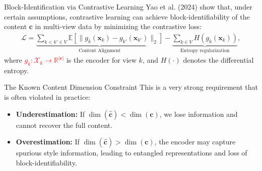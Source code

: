 \documentclass[a4paper,10pt]{beamer}
\begin{document}
\begin{frame}{Block-Identification via Contrastive Learning}
  Yao et al. (2024) \cite{yao2024multiviewcausalrepresentationlearning} show that, under certain assumptions, contrastive learning can achieve block-identifiability of the content $\mathbf{c}$ in multi-view data by minimizing the contrastive loss:
  \begin{align*}
    \mathcal{L} = \underbrace{\sum_{k < k' \in V} \mathbb{E} \left[ \|g_k(\mathbf{x}_k) - g_{k'}(\mathbf{x}_{k'})\|_2 \right]}_{\text{Content Alignment}} - \underbrace{\sum_{k \in V} H(g_k(\mathbf{x}_k))}_{\text{Entropy regularization}},
  \end{align*}
  where \textcolor<2>{red}{$g_k : \mathcal{X}_k \to \mathbb{R}^{|\mathbf{c}|}$} is the encoder for view $k$, and $H(\cdot)$ denotes the differential entropy.
  \vfill
\end{frame}

\begin{frame}{The Known Content Dimension Constraint}
  This is a very strong requirement that is often violated in practice:
  \begin{itemize}
    \item \textbf{Underestimation:} If $\dim(\hat{\mathbf{c}}) < \dim(\mathbf{c})$, we lose information and cannot recover the full content.
    \item \textbf{Overestimation:} If $\dim(\hat{\mathbf{c}}) > \dim(\mathbf{c})$, the encoder may capture spurious style information, leading to entangled representations and loss of block-identifiability.
  \end{itemize}
\end{frame}
\end{document}

